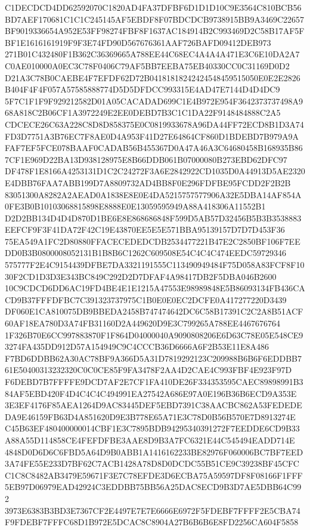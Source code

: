 \documentclass[UTF8,fontset=fandol,zihao=-4,a4paper]{ctexart}
\begin{document}
{{C1DECDCD4DD62592070C1820AD4FA37DFBF6D1D1D10C9E3564C810BCB56BD7AEF170681C1C1C245145AF5EBDF8F07BDCDCB9738915BB9A3469C22657
BF9019336654A952E53FF98274FBF8F1637AC184914B2C993469D2C58B17AF5FBF1E1616161919F9F3E74FD90D567676361AAF726BAFD09412DEB973
271B01C432480F1B362C36369665A788EE44C68EC4A4A4A471E3C6E10DA2A7C0AE010000A0EC3C78F0406C79AF5BB7EEBA75EB40330CC0C31169D0D2
D21A3C78B0CAEBE4F7EFDF62D72B04181818242424548459515050E0E2E2826B404F4F4F057A57585888774D5D5DFDCC993315E4AD47E7144D4D4DC9
5F7C1F1F9F929212582D01A05CACADAD699C1E4B972E954F3642373737498A968A818C2B06CF1A3972249E2EE0DEBD7B3C1C1DA22F9148484888C2A5
CDCECE26C63A228C8D8D858375E0C0819933678A96DA44FF72ECD8B1D3A74FD3D7751A3B76EC7F8AE0D4A953F41D27E64864CF860D1BDEBD7B979A9A
FAF7EF5FCE078BAAF0CADAB56B455367D0A47A46A3C64680458B168935B867CF1E969D22BA13D938128975E8B66DDB061B07000080B273EBD62DFC97
DF478F1E8166A4253131D1C2C24272F3A6E2842922CD1035D0A44913D5AE2320E4DBB76FAA7ABB199D7A8809732AD4BB8F0E296FDFBE95FCDD2F2B2B
83051300A8282A2AEAD0A1838E8E0E4DA5215757577906A32E5DBA14AF854A0FE3B0B10103068815898E8888E0E13059595949A88A418306A11552B1
D2D2BB134D4D4D870D1BE6E8E868686848F599D5AB57D32456B5B3B3538883EEFCF9F3F41DA72F42C19E43870EE5E5E571BBA95139157D7D7D453F36
75EA549A1FC2D80880FFACECEDEDCDB2534477221B47E2C2850BF106F7EEDD0B3B0800008052131B1B8B6C1262C609508E54C4C4C474EEDC59729346
575777F2E4C9154439DFBE7DA3321191555C113490949484F75D058A83FCF8F1030F2CD1D3D3E343BC849C292D2D7DFAF4A98417DB2F5DBA046B2600
10C9CDCD6DD6AC19FD4BE4E1E1215A47553E98989848E5B86093134FB436CACD9B37FFFDFBC7C391323737975C1B0E0E0EC2DCFE0A417277220D3439
DF060E1CA810075DB9BBEDA2458B747474642DC6C58B17391C2C2A8B51ACF60AF18EA780D3A74FB31160D2A449620D9E3C799265A788EE4467676764
1F326B70E6CC997883870F1F864D04000040A9090808206E6D63C78E05E548CE93274FA435DD912D57A154949C9C4CCCB36D6666A6F2B53E11E8A486
F7BD6DDBB62A30AC78BF9A366D5A31D7819292123C209988B6B6F6EDDBB761E50400313232320C0C0CE85F9FA3478F2AA4D2CAE4C993FBF4E923F97D
F6DEBD7B7FFFFE9DCD7AF2E7CF1FA410DE26F334353595CAEC89898991B384AF5EBD420F4D4C4C4C494991EA27542A686E97A0E196B36B6ECD9A353E
3E3EF4176F85AEA1264D9AC83445DEF5EBD7391C38AACBC862A53FEDEDEDA9E46159FB63D4A851620D9E3B778E65A71E3C78D0B56B570E7D8913274E
C45B63EF480400000014CBF1E3C7895BDB94295340391272F7EEDDE6CD9B33A88A55D114858CE4FEFDFBE3AAE8D9B3A7FC6321E44C545494EADD714E
4848D0D6D6C6FBD5A64D9B0ABB1A1416162233BE82976F060006BC7BF7EED3A74FE55E233D7BF62C7ACB1428A78D8D0DCDC55B51CE9C39238BF45CFC
C1C8C8482AB3479E59671F3E7C78EFDE3D6ECBA75A59597DF8F08166F1FFF5EB97D06979EAD42924C3EDDBB75BB56A25DAC8ECD9B3D7AE5DBB64C992
3973E6383B3BD3E7367CF2E4497E7E7E6666E6972F5FDEBF7FFFF2E5CBA74F9FDEBF7FFFC68D1B972E5DCAC8C8904A27B6B6B6E8FD2256CA604F5858
}}
\end{document}
